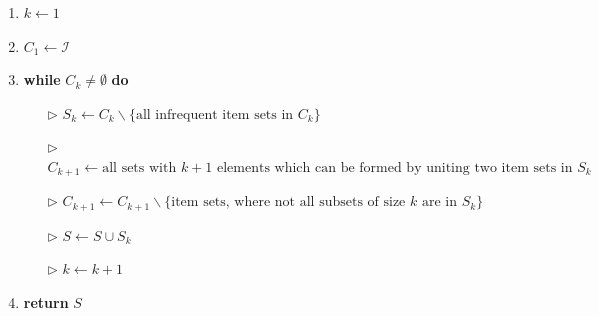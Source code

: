 \begin{frame}
	\begin{enumerate}
		\item $k \leftarrow 1$
		\item $C_1 \leftarrow \mathcal{I}$
		\item \textbf{while} $C_k \ne \emptyset$ \textbf{do}
		\begin{itemize}
			\item[$\triangleright$] $S_k \leftarrow C_k \backslash \{ \text{all infrequent item sets in $C_k$} \}$
			\item[$\triangleright$] $C_{k+1} \leftarrow \text{all sets with $k + 1$ elements which can be formed by uniting two item sets in $S_k$}$
			\item[$\triangleright$] $C_{k+1} \leftarrow C_{k+1} \backslash \{ \text{item sets, where not all subsets of size $k$ are in $S_k$} \}$
			\item[$\triangleright$] $S \leftarrow S \cup S_k$
			\item[$\triangleright$] $k \leftarrow k + 1$
		\end{itemize}
		\item \textbf{return} $S$
	\end{enumerate}

\end{frame}


